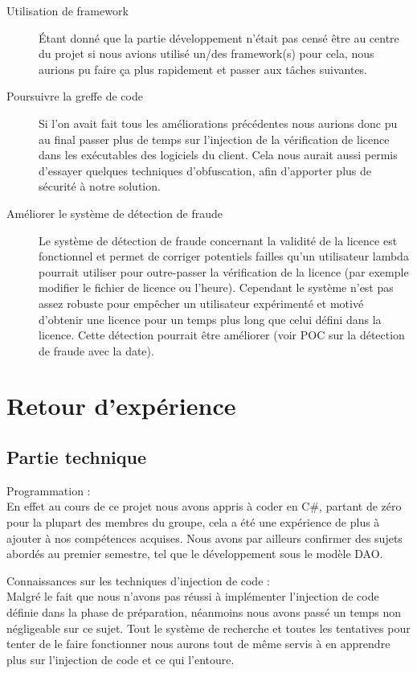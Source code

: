 \begin{description}
    \item[Utilisation de framework]
        Étant donné que la partie développement n'était pas censé être au centre du projet si nous avions utilisé un/des
        framework(s) pour cela, nous aurions pu faire ça plus rapidement et passer aux tâches suivantes.
    \item[Poursuivre la greffe de code]
        Si l'on avait fait tous les améliorations précédentes nous aurions donc pu au final passer plus de temps sur 
        l'injection de la vérification de licence dans les exécutables des logiciels du client. Cela nous aurait aussi
        permis d'essayer quelques techniques d'obfuscation, afin d'apporter plus de sécurité à notre solution.
    \item[Améliorer le système de détection de fraude]
        Le système de détection de fraude concernant la validité de la licence est fonctionnel et permet de corriger
        potentiels failles qu'un utilisateur lambda pourrait utiliser pour outre-passer la vérification de la licence
        (par exemple modifier le fichier de licence ou l'heure). Cependant le système n'est pas assez robuste pour
        empêcher un utilisateur expérimenté et motivé d'obtenir une licence pour un temps plus long que celui défini
        dans la licence. Cette détection pourrait être améliorer (voir POC sur la détection de fraude avec la date).
\end{description}

\chapter{Retour d'expérience}

\section{Partie technique}
    Programmation :\\
    \newline
    En effet au cours de ce projet nous avons appris à coder en C\#, partant de zéro pour la plupart des membres du groupe, 
    cela a été une expérience de plus à ajouter à nos compétences acquises. Nous avons par ailleurs confirmer des sujets abordés 
    au premier semestre, tel que le développement sous le modèle DAO.
    \newline

     Connaissances sur les techniques d'injection de code :\\
    \newline
    Malgré le fait que nous n'avons pas réussi à implémenter l'injection de code définie dans la phase de préparation, 
    néanmoins nous avons passé un temps non négligeable sur ce sujet. Tout le système de recherche et toutes les tentatives pour 
    tenter de le faire fonctionner nous aurons tout de même servis à en apprendre plus sur l'injection de code et ce qui l'entoure.
    \newline

